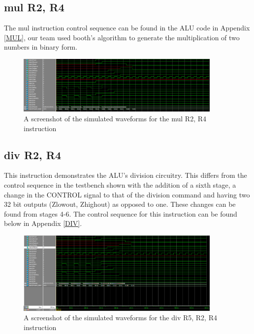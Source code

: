 \documentclass{article}
\begin{document}
    \subsection{mul R2, R4}
    
    The mul instruction control sequence can be found in the ALU code in Appendix \ref{MUL}, our team used booth's algorithm to generate the multiplication of two numbers in binary form. 
    
    \begin{figure}[h!]
        \begin{center}
            \includegraphics[width=10cm]{mul}
            \caption{A screenshot of the simulated waveforms for the mul R2, R4 instruction}
        \end{center}
    \end{figure}

    \subsection{div R2, R4}
    
    This instruction demonstrates the ALU's division circuitry. This differs from the control sequence in the testbench shown with the addition of a sixth stage, a change in the CONTROL signal to that of the division command and having two 32 bit outputs (Zlowout, Zhighout) as opposed to one. These changes can be found from stages 4-6. The control sequence for this instruction can be found below in Appendix \ref{DIV}.
    
    \begin{figure}[h!]
        \begin{center}
            \includegraphics[width=10cm]{div}
            \caption{A screenshot of the simulated waveforms for the div R5, R2, R4 instruction}
        \end{center}
    \end{figure}
\end{document}
